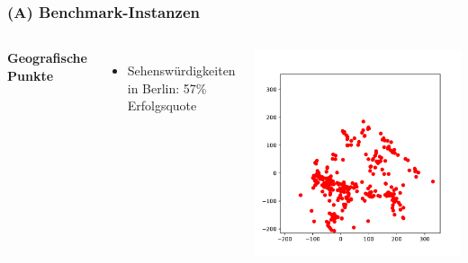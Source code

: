 \documentclass[aspectratio=169]{beamer}
\begin{document}
\begin{frame}
	\frametitle{(A) Benchmark-Instanzen}
	\begin{columns}[c] %
	
	\textbf{Geografische Punkte}
	\begin{itemize}
		\item Sehenswürdigkeiten in Berlin: 57\% Erfolgsquote
	\end{itemize}
	
	\includegraphics[scale=.5]{tourist.pdf}
	

	\end{columns}
	\end{frame}

\end{document}
